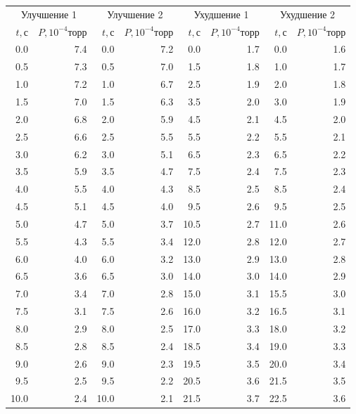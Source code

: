 \documentclass{article}
\begin{document}
    \begin{table}[!h]
    \begin{center}
    \begin{tabular}{rr|rr|rr|rr}
    \toprule
    \multicolumn{2}{c|}{Улучшение 1} & \multicolumn{2}{c|}{Улучшение 2} & \multicolumn{2}{c|}{Ухудшение 1} & \multicolumn{2}{c}{Ухудшение 2}\\
    $t, с$ &  $P, 10^{-4}торр$ & $t, с$ &  $P, 10^{-4}торр$ & $t, с$ &  $P, 10^{-4}торр$ & $t, с$ &  $P, 10^{-4}торр$\\
    \midrule
     0.0 &  7.4 &  0.0 &  7.2 &  0.0 & 1.7 &  0.0 & 1.6 \\
     0.5 &  7.3 &  0.5 &  7.0 &  1.5 & 1.8 &  1.0 & 1.7 \\
     1.0 &  7.2 &  1.0 &  6.7 &  2.5 & 1.9 &  2.0 & 1.8 \\
     1.5 &  7.0 &  1.5 &  6.3 &  3.5 & 2.0 &  3.0 & 1.9 \\
     2.0 &  6.8 &  2.0 &  5.9 &  4.5 & 2.1 &  4.5 & 2.0 \\\hline
     2.5 &  6.6 &  2.5 &  5.5 &  5.5 & 2.2 &  5.5 & 2.1 \\
     3.0 &  6.2 &  3.0 &  5.1 &  6.5 & 2.3 &  6.5 & 2.2 \\
     3.5 &  5.9 &  3.5 &  4.7 &  7.5 & 2.4 &  7.5 & 2.3 \\
     4.0 &  5.5 &  4.0 &  4.3 &  8.5 & 2.5 &  8.5 & 2.4 \\
     4.5 &  5.1 &  4.5 &  4.0 &  9.5 & 2.6 &  9.5 & 2.5 \\\hline
     5.0 &  4.7 &  5.0 &  3.7 & 10.5 & 2.7 & 11.0 & 2.6 \\
     5.5 &  4.3 &  5.5 &  3.4 & 12.0 & 2.8 & 12.0 & 2.7 \\
     6.0 &  4.0 &  6.0 &  3.2 & 13.0 & 2.9 & 13.0 & 2.8 \\
     6.5 &  3.6 &  6.5 &  3.0 & 14.0 & 3.0 & 14.0 & 2.9 \\
     7.0 &  3.4 &  7.0 &  2.8 & 15.0 & 3.1 & 15.5 & 3.0 \\\hline
     7.5 &  3.1 &  7.5 &  2.6 & 16.0 & 3.2 & 16.5 & 3.1 \\
     8.0 &  2.9 &  8.0 &  2.5 & 17.0 & 3.3 & 18.0 & 3.2 \\
     8.5 &  2.8 &  8.5 &  2.4 & 18.5 & 3.4 & 19.0 & 3.3 \\
     9.0 &  2.6 &  9.0 &  2.3 & 19.5 & 3.5 & 20.0 & 3.4 \\
     9.5 &  2.5 &  9.5 &  2.2 & 20.5 & 3.6 & 21.5 & 3.5 \\\hline
    10.0 &  2.4 & 10.0 &  2.1 & 21.5 & 3.7 & 22.5 & 3.6 \\

\end{tabular}
\end{center}
\end{table}
\end{document}
